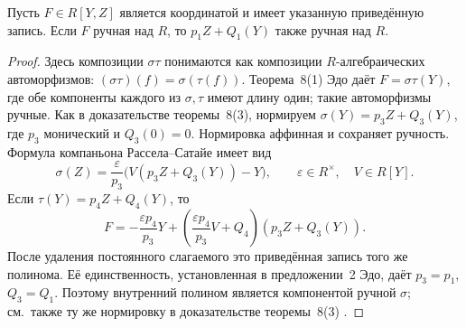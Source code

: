 \begin{lemma}\label{lem:inner-wild}
Пусть $F\in R[Y,Z]$ является координатой и имеет указанную
приведённую запись. Если $F$ ручная над $R$, то
$p_1Z+Q_1(Y)$ также ручная над $R$.
\end{lemma}
\begin{proof}
Здесь композиции $\sigma\tau$ понимаются как композиции
$R$-алгебраических автоморфизмов: $(\sigma\tau)(f)=\sigma(\tau(f))$.
Теорема~8(1) Эдо даёт $F=\sigma\tau(Y)$, где обе компоненты каждого
из $\sigma,\tau$ имеют длину один; такие автоморфизмы ручные.
Как в доказательстве теоремы~8(3), нормируем
$\sigma(Y)=p_3Z+Q_3(Y)$, где $p_3$ монический и $Q_3(0)=0$.
Нормировка аффинная и сохраняет ручность.
Формула компаньона Рассела--Сатайе имеет вид
\[
 \sigma(Z)=\frac{\varepsilon}{p_3}
 \bigl(V(p_3Z+Q_3(Y))-Y\bigr),\qquad
 \varepsilon\in R^\times,\quad V\in R[Y].
\]
Если $\tau(Y)=p_4Z+Q_4(Y)$, то
\[
 F=-\frac{\varepsilon p_4}{p_3}Y+
 \left(\frac{\varepsilon p_4}{p_3}V+Q_4\right)
 (p_3Z+Q_3(Y)).
\]
После удаления постоянного слагаемого это приведённая запись того же
полинома. Её единственность, установленная в предложении~2 Эдо,
даёт $p_3=p_1$, $Q_3=Q_1$. Поэтому внутренний полином является
компонентой ручной $\sigma$; см.\ также ту же нормировку в
доказательстве теоремы~8(3) \cite{Edo2013}.
\end{proof}

